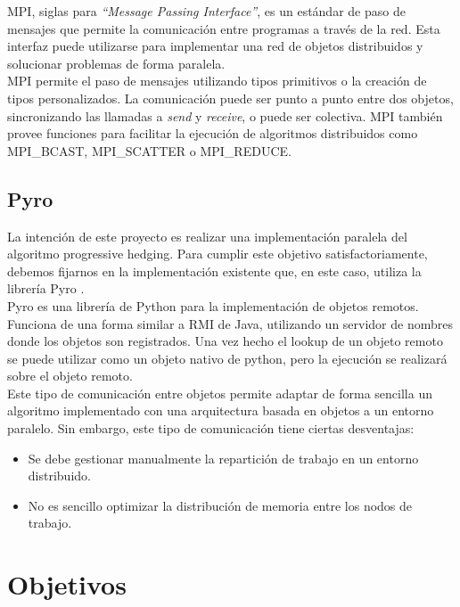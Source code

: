  MPI, siglas para \textit{``Message Passing Interface''}, es un estándar de paso de mensajes que permite la comunicación entre programas a través de la red. Esta interfaz puede utilizarse para implementar una red de objetos distribuidos y solucionar problemas de forma paralela.\\

 MPI permite el paso de mensajes utilizando tipos primitivos o la creación de tipos personalizados. La comunicación puede ser punto a punto entre dos objetos, sincronizando las llamadas a \textit{send} y \textit{receive}, o puede ser colectiva. MPI también provee funciones para facilitar la ejecución de algoritmos distribuidos como MPI\_BCAST, MPI\_SCATTER o MPI\_REDUCE.
 
\subsection{Pyro}

La intención de este proyecto es realizar una implementación paralela del algoritmo progressive hedging. Para cumplir este objetivo satisfactoriamente, debemos fijarnos en la implementación existente que, en este caso, utiliza la librería Pyro \cite{pyro}. \\

Pyro es una librería de Python para la implementación de objetos remotos. Funciona de una forma similar a RMI de Java, utilizando un servidor de nombres donde los objetos son registrados. Una vez hecho el lookup de un objeto remoto se puede utilizar como un objeto nativo de python, pero la ejecución se realizará sobre el objeto remoto.\\

Este tipo de comunicación entre objetos permite adaptar de forma sencilla un algoritmo implementado con una arquitectura basada en objetos a un entorno paralelo. Sin embargo, este tipo de comunicación tiene ciertas desventajas:

\begin{itemize}
    \item Se debe gestionar manualmente la repartición de trabajo en un entorno distribuido.
    \item No es sencillo optimizar la distribución de memoria entre los nodos de trabajo.
\end{itemize}

\section{Objetivos}

